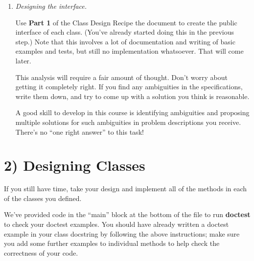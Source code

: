 \documentclass[12pt]{article}
\begin{document}
\begin{enumerate}[1.]
\item \textit{Designing the interface.}

Use \textbf{Part 1} of the Class Design Recipe the document to create the public interface of each class.
(You’ve already started doing this in the previous step.) Note that this involves a lot of documentation and writing of basic examples and tests, but still no implementation whatsoever. That will come later.

\bigskip

This analysis will require a fair amount of thought. Don’t worry about getting it completely right. If you find any ambiguities in the specifications, write them down, and try to come up with a solution you think is reasonable.

\bigskip

A good skill to develop in this course is identifying ambiguities and proposing multiple solutions for such ambiguities in problem descriptions you receive. There’s no “one right answer” to this task!

\end{enumerate}

\bigskip

\section*{2) Designing Classes}

If you still have time, take your design and implement all of the methods in each of the classes you defined.

\bigskip

\noindent We’ve provided code in the “main” block at the bottom of the file to run \textbf{doctest} to check your doctest examples. You should have already written a doctest example in your class docstring by following the above instructions; make sure you add some further examples to individual methods to help check the correctness of your code.
\end{document}
